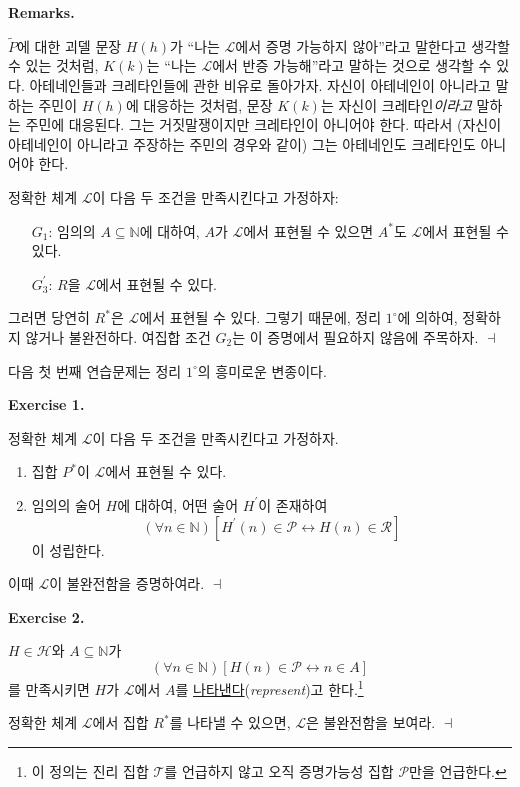 \documentclass[12pt]{paper}
\newenvironment{context}[1][]
{ \noindent \textbf{{#1}.}
}
{ \hfill $ \dashv $ }
\begin{document}
\begin{context}[Remarks]
$\widetilde{P}$에 대한 괴델 문장 $H \left( h \right)$가 ``나는 $\mathcal{L}$에서 증명 가능하지 않아''라고 말한다고 생각할 수 있는 것처럼,
$K \left( k \right)$는 ``나는 $\mathcal{L}$에서 반증 가능해''라고 말하는 것으로 생각할 수 있다.
아테네인들과 크레타인들에 관한 비유로 돌아가자.
자신이 아테네인이 아니라고 말하는 주민이 $H \left( h \right)$에 대응하는 것처럼,
문장 $K \left( k \right)$는 자신이 크레타인\textit{이라고} 말하는 주민에 대응된다.
그는 거짓말쟁이지만 크레타인이 아니어야 한다.
따라서 (자신이 아테네인이 아니라고 주장하는 주민의 경우와 같이) 그는 아테네인도 크레타인도 아니어야 한다.

정확한 체계 $\mathcal{L}$이 다음 두 조건을 만족시킨다고 가정하자:
\begin{itemize}
\item[$G_{1}$:] 임의의 $A \subseteq \mathbb{N}$에 대하여, $A$가 $\mathcal{L}$에서 표현될 수 있으면 $A^{*}$도 $\mathcal{L}$에서 표현될 수 있다.
\item[$G_{3}^{\prime}$:] $R$을 $\mathcal{L}$에서 표현될 수 있다.
\end{itemize}

그러면 당연히 $R^{*}$은 $\mathcal{L}$에서 표현될 수 있다.
그렇기 때문에, 정리 $1^{\circ}$에 의하여, 정확하지 않거나 불완전하다.
여집합 조건 $G_{2}$는 이 증명에서 필요하지 않음에 주목하자.
\end{context}

다음 첫 번째 연습문제는 정리 $1^{\circ}$의 흥미로운 변종이다.

\begin{context}[Exercise 1]
정확한 체계 $\mathcal{L}$이 다음 두 조건을 만족시킨다고 가정하자.
\begin{enumerate}
\item 집합 $P^{*}$이 $\mathcal{L}$에서 표현될 수 있다.
\item 임의의 술어 $H$에 대하여, 어떤 술어 $H^{\prime}$이 존재하여 $$\left( \forall n \in \mathbb{N} \right) \left[ H^{\prime} \left( n \right) \in \mathcal{P} \leftrightarrow H \left( n \right) \in \mathcal{R} \right]$$이 성립한다.
\end{enumerate}

이때 $\mathcal{L}$이 불완전함을 증명하여라.
\end{context}

\begin{context}[Exercise 2]
$H \in \mathcal{H}$와 $A \subseteq \mathbb{N}$가
$$ \left( \forall n \in \mathbb{N} \right) \left[ H \left( n \right) \in \mathcal{P} \leftrightarrow n \in A \right] $$를 만족시키면
$H$가 $\mathcal{L}$에서 $A$를 \underline{나타낸다}(\textit{represent})고 한다.\footnote
{
이 정의는 진리 집합 $\mathcal{T}$를 언급하지 않고 오직 증명가능성 집합 $\mathcal{P}$만을 언급한다.
}

정확한 체계 $\mathcal{L}$에서 집합 $R^{*}$를 나타낼 수 있으면, $\mathcal{L}$은 불완전함을 보여라.
\end{context}
\end{document}
